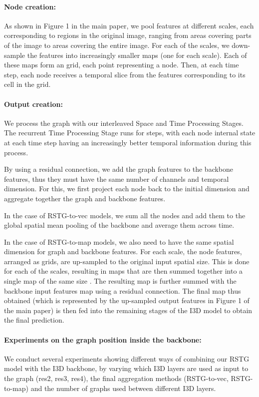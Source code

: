 \documentclass{article}
\begin{document}
\paragraph{Node creation:} As shown in Figure 1 in the main paper, we pool features at  different scales, each corresponding to regions in the original image, ranging from areas covering parts of the image to areas covering the entire image. For each of the  scales, we down-sample the features into increasingly smaller maps (one for each scale). Each of these maps form an  grid, each point representing a node. 
Then, at each time step, each node receives a temporal slice from the features corresponding to its cell in the grid. 



\paragraph {Output creation: } We process the graph with our interleaved Space and Time Processing Stages. The recurrent Time Processing Stage runs for  steps, with each node internal state  at each time step having an increasingly better temporal information during this process. 




By using a residual connection, we add the graph features to the backbone features, thus they must have the same number of channels and temporal dimension. For this, we first project each node back to the initial  dimension and aggregate together the graph and backbone features.

In the case of RSTG-to-vec models, we sum all the nodes and add them to the global spatial mean pooling of the backbone and average them across time.

In the case of RSTG-to-map models, we also need to have the same spatial dimension for graph and backbone features. 
For each scale, the node features, arranged as grids, are up-sampled to the original input spatial size. This is done for each of the  scales, resulting in   maps that are then summed together into a single map of the same size . The resulting map is further summed with the backbone input features map using a residual connection. The final map thus obtained (which is represented by the up-sampled output features in Figure 1 of the main paper) is then fed into the remaining stages of the I3D model to obtain the final prediction.


\paragraph{Experiments on the graph position inside the backbone: } We conduct several experiments showing different ways of combining our RSTG model with the I3D backbone, by varying which I3D layers are used as input to the graph (res2, res3, res4), the final aggregation methods (RSTG-to-vec, RSTG-to-map) and the number of graphs used between different I3D layers.
\end{document}
